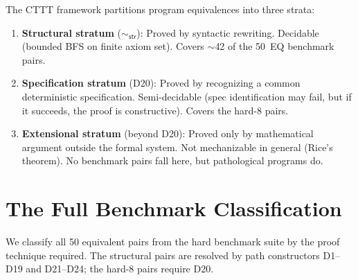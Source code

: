 \begin{remark}
The CTTT framework partitions program equivalences into three strata:
\begin{enumerate}
  \item \textbf{Structural stratum} ($\sim_{\mathsf{str}}$):
    Proved by syntactic rewriting.  Decidable (bounded BFS on finite
    axiom set).  Covers ${\sim}$42 of the 50~EQ benchmark pairs.
  \item \textbf{Specification stratum} (D20):
    Proved by recognizing a common deterministic specification.
    Semi-decidable (spec identification may fail, but if it succeeds,
    the proof is constructive).  Covers the hard-8 pairs.
  \item \textbf{Extensional stratum} (beyond D20):
    Proved only by mathematical argument outside the formal system.
    Not mechanizable in general (Rice's theorem).  No benchmark pairs
    fall here, but pathological programs do.
\end{enumerate}
\end{remark}


\section{The Full Benchmark Classification}
\label{sec:benchmark-classification}

We classify all 50 equivalent pairs from the hard benchmark suite by
the proof technique required.  The structural pairs are resolved by
path constructors D1--D19 and D21--D24; the hard-8 pairs require D20.

